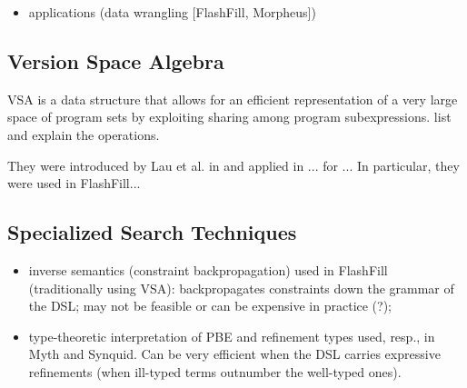\begin{itemize}
\item applications (data wrangling [FlashFill, Morpheus])
\end{itemize}

\subsection{Version Space Algebra}



\ac{VSA} is a data structure that allows for an efficient representation of a
very large space of program sets by exploiting sharing among program
subexpressions.  {list and explain the operations}.

They were introduced by Lau et al. in \cite{Lau:2000} and applied in ... for ...
In particular, they were used in FlashFill...


\subsection{Specialized Search Techniques}
\label{sec:pbe-search-techniques}



\begin{itemize}
\item inverse semantics (constraint backpropagation) used in FlashFill
(traditionally using \ac{VSA}): backpropagates constraints down the grammar of
the \ac{DSL}; may not be feasible or can be expensive in practice (?);
\item type-theoretic interpretation of \ac{PBE} and refinement types used, resp.,
in Myth and Synquid. Can be very efficient when the \ac{DSL} carries expressive
refinements (when ill-typed terms outnumber the well-typed ones).
\end{itemize}

